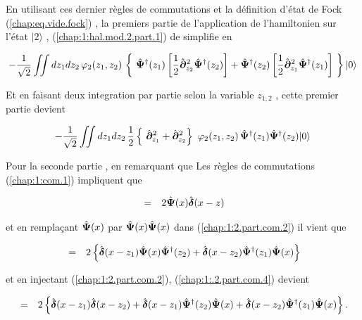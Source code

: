 En utilisant ces dernier règles de commutations et la définition d'état de Fock (\ref{chap:eq.vide.fock}) , la premiers partie de l'application de l'hamiltonien sur l'état $\vert 2  \rangle$ , (\ref{chap:1:hal.mod.2.part.1}) de simplifie en 

\begin{eqnarray}
	 - \frac{1}{ \sqrt{2}} \iint dz_1 dz_2 \, \varphi_2(z_1, z_2) \,	 \left \{ \operator{\Psi}^\dag(z_1) \left [\frac{1}{2}\operator{\partial}_{z_2}^2 \operator{\Psi}^\dag(z_2) \right ] + \operator{\Psi}^\dag(z_2) \left [\frac{1}{2}\operator{\partial}_{z_1}^2 \operator{\Psi}^\dag(z_1)  \right]  \right \}  \vert 0 \rangle 	
\end{eqnarray}

Et en faisant deux integration par partie selon la variable $z_{1,2}$ , cette premier partie devient

\begin{eqnarray}
	 - \frac{1}{ \sqrt{2}}  \iint dz_1 dz_2  \,  \frac{1}{2} \left \{ \operator{\partial}_{z_1}^2 +  \operator{\partial}_{z_2}^2 \right\} \varphi_2(z_1, z_2) \,	 \operator{\Psi}^\dag(z_1) \operator{\Psi}^\dag(z_2) \vert 0 \rangle \label{chap:1:hal.mod.2.part.1.1}	
\end{eqnarray}

Pour la seconde partie  , en remarquant que Les règles de commutations (\ref{chap:1:com.1}) impliquent que 

\begin{eqnarray}
	[ \operator{\Psi}(x) \operator{\Psi}(x),  \operator{\Psi}^\dag(z) ] & =& 2\operator{\Psi}(x)\operator{\delta}(x - z)\label{chap:1:com.3}  		
\end{eqnarray}

et en remplaçant $\hat{\bm{\Psi}}(x)$ par $\hat{\bm{\Psi}}(x)\hat{\bm{\Psi}}(x)$ dans  (\ref{chap:1:2.part.com.2}) il vient que  

\begin{eqnarray}
	[ \operator{\Psi}(x)\operator{\Psi}(x),  \operator{\Psi}^\dag(z_1) \operator{\Psi}^\dag(z_2)  ]  &=&  2 \left \{   \operator{\delta}(x-z_1)\operator{\Psi}(x)\operator{\Psi}^\dag(z_2)  + \operator{\delta}(x-z_2)\operator{\Psi}^\dag(z_1)  \operator{\Psi}(x)\right \} \label{chap:1:.2.part.com.4}		
\end{eqnarray}

et en injectant (\ref{chap:1:2.part.com.2}),  (\ref{chap:1:.2.part.com.4}) devient 

\begin{eqnarray}
	[ \operator{\Psi}(x)\operator{\Psi}(x),  \operator{\Psi}^\dag(z_1)\operator{\Psi}^\dag(z_2)  ]  &=& 2 \left \{\operator{\delta}(x-z_1)\operator{\delta}(x-z_2) +   \operator{\delta}(x-z_1)\operator{\Psi}^\dag(z_2)\operator{\Psi}(x)  + \operator{\delta}(x-z_2)\operator{\Psi}^\dag(z_1)  \operator{\Psi}(x)\right \} \label{chap:1:2.part.com.5}	.	
\end{eqnarray}

